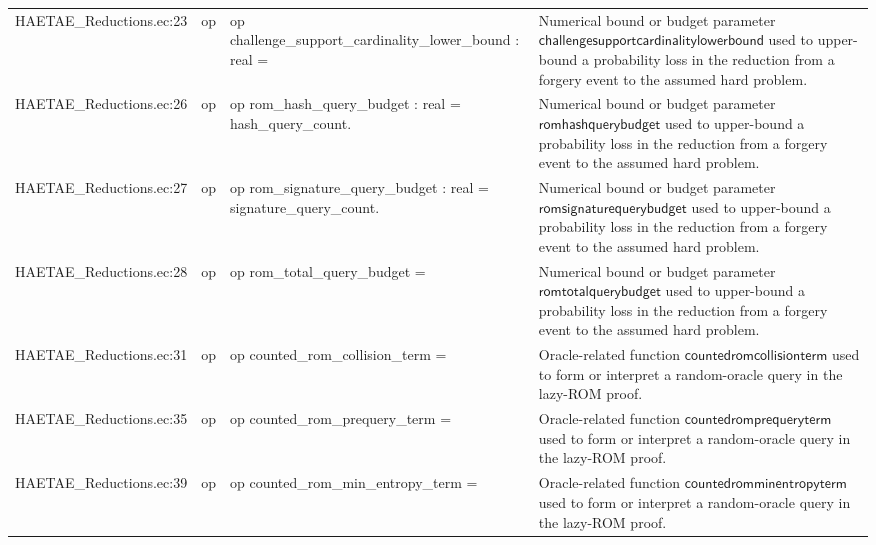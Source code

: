 \documentclass[10pt]{article}
\begin{document}
\begin{longtable}{L{0.11\textwidth}L{0.055\textwidth}L{0.385\textwidth}L{0.41\textwidth}}
HAETAE\_\allowbreak{}Reductions.\allowbreak{}ec:\allowbreak{}23 & op & {\ttfamily\scriptsize op challenge\_\allowbreak{}support\_\allowbreak{}cardinality\_\allowbreak{}lower\_\allowbreak{}bound : real =} & Numerical bound or budget parameter $\mathsf{challengesupportcardinalitylowerbound}$ used to upper-bound a probability loss in the reduction from a forgery event to the assumed hard problem. \\
HAETAE\_\allowbreak{}Reductions.\allowbreak{}ec:\allowbreak{}26 & op & {\ttfamily\scriptsize op rom\_\allowbreak{}hash\_\allowbreak{}query\_\allowbreak{}budget : real = hash\_\allowbreak{}query\_\allowbreak{}count.} & Numerical bound or budget parameter $\mathsf{romhashquerybudget}$ used to upper-bound a probability loss in the reduction from a forgery event to the assumed hard problem. \\
HAETAE\_\allowbreak{}Reductions.\allowbreak{}ec:\allowbreak{}27 & op & {\ttfamily\scriptsize op rom\_\allowbreak{}signature\_\allowbreak{}query\_\allowbreak{}budget : real = signature\_\allowbreak{}query\_\allowbreak{}count.} & Numerical bound or budget parameter $\mathsf{romsignaturequerybudget}$ used to upper-bound a probability loss in the reduction from a forgery event to the assumed hard problem. \\
HAETAE\_\allowbreak{}Reductions.\allowbreak{}ec:\allowbreak{}28 & op & {\ttfamily\scriptsize op rom\_\allowbreak{}total\_\allowbreak{}query\_\allowbreak{}budget =} & Numerical bound or budget parameter $\mathsf{romtotalquerybudget}$ used to upper-bound a probability loss in the reduction from a forgery event to the assumed hard problem. \\
HAETAE\_\allowbreak{}Reductions.\allowbreak{}ec:\allowbreak{}31 & op & {\ttfamily\scriptsize op counted\_\allowbreak{}rom\_\allowbreak{}collision\_\allowbreak{}term =} & Oracle-related function $\mathsf{countedromcollisionterm}$ used to form or interpret a random-oracle query in the lazy-ROM proof. \\
HAETAE\_\allowbreak{}Reductions.\allowbreak{}ec:\allowbreak{}35 & op & {\ttfamily\scriptsize op counted\_\allowbreak{}rom\_\allowbreak{}prequery\_\allowbreak{}term =} & Oracle-related function $\mathsf{countedromprequeryterm}$ used to form or interpret a random-oracle query in the lazy-ROM proof. \\
HAETAE\_\allowbreak{}Reductions.\allowbreak{}ec:\allowbreak{}39 & op & {\ttfamily\scriptsize op counted\_\allowbreak{}rom\_\allowbreak{}min\_\allowbreak{}entropy\_\allowbreak{}term =} & Oracle-related function $\mathsf{countedromminentropyterm}$ used to form or interpret a random-oracle query in the lazy-ROM proof. \\

\end{longtable}
\end{document}
